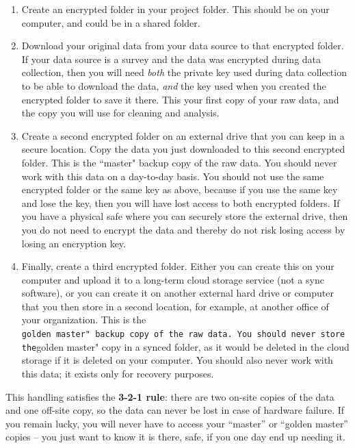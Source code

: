 \documentclass[
]{book}
\begin{document}
\begin{enumerate}
\def\labelenumi{\arabic{enumi}.}
\item
  Create an encrypted folder in your project folder.
  This should be on your computer, and could be in a shared folder.
\item
  Download your original data from your data source to that encrypted folder.
  If your data source is a survey and the data was encrypted during data collection,
  then you will need \emph{both} the private key used during data collection to be able to download the data,
  \emph{and} the key used when you created the encrypted folder to save it there.
  This your first copy of your raw data, and the copy you will use for cleaning and analysis.
\item
  Create a second encrypted folder on an external drive that you can keep in a secure location.
  Copy the data you just downloaded to this second encrypted folder.
  This is the ``master" backup copy of the raw data.
  You should never work with this data on a day-to-day basis.
  You should not use the same encrypted folder or the same key as above,
  because if you use the same key and lose the key,
  then you will have lost access to both encrypted folders.
  If you have a physical safe where you can securely store the external drive,
  then you do not need to encrypt the data
  and thereby do not risk losing access by losing an encryption key.
\item
  Finally, create a third encrypted folder.
  Either you can create this on your computer and upload it to a long-term cloud storage service (not a sync software),
  or you can create it on another external hard drive or computer that you then store in a second location,
  for example, at another office of your organization.
  This is the \texttt{golden\ master"\ backup\ copy\ of\ the\ raw\ data.\ You\ should\ never\ store\ the}golden master" copy in a synced folder,
  as it would be deleted in the cloud storage if it is deleted on your computer.
  You should also never work with this data;
  it exists only for recovery purposes.
\end{enumerate}

This handling satisfies the \textbf{3-2-1 rule}:
there are two on-site copies of the data and one off-site copy,
so the data can never be lost in case of hardware failure.
If you remain lucky, you will never have to access your ``master'' or ``golden master'' copies --
you just want to know it is there, safe, if you one day end up needing it.
\end{document}
